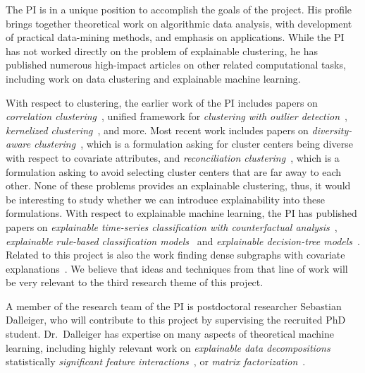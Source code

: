 \documentclass[a4paper,11pt]{article}
\begin{document}

The PI is in a unique position to accomplish the goals of the project. 
His profile brings together theoretical work on algorithmic data analysis, 
with development of practical data-mining methods, and emphasis on applications. 
While the PI has not worked directly on the problem of explainable clustering,
he has published numerous high-impact articles on other related computational tasks, 
including work on data clustering and explainable machine learning. 

With respect to clustering, 
the earlier work of the PI includes papers on
\emph{correlation clustering}~\cite{bonchi2013overlapping,gionis2007clustering},
unified framework for \emph{clustering with outlier detection}~\cite{chawla2013k},
\emph{kernelized clustering}~\cite{amid2015kernel}, and more.
Most recent work includes papers on
\emph{diversity-aware clustering}~\cite{thejaswi2021diversity}, 
which is a formulation asking for cluster centers being diverse with respect to covariate attributes, and
\emph{reconciliation clustering}~\cite{spoerhase2023constant}, 
which is a formulation asking to avoid selecting cluster centers that are far away to each other.
None of these problems provides an explainable clustering, 
thus, it would be interesting to study whether we can introduce explainability
into these formulations.
%
With respect to explainable machine learning, 
the PI has published papers on 
\emph{explainable time-series classification with counterfactual analysis}~\cite{karlsson2020locally},
\emph{explainable rule-based classification models}~\cite{ciaperoni2023concise,zhang2020diverse}
and 
\emph{explainable decision-tree models}~\cite{zhang2023regularized}. 
Related to this project is also the work
finding dense subgraphs with covariate explanations~\cite{galbrun2014overlapping,galbrun2016top}.
We believe that ideas and techniques from that line of work
will be very relevant to the third research theme of this project.

A member of the research team of the PI is postdoctoral researcher Sebastian Dalleiger, 
who will contribute to this project by supervising the recruited PhD student.
Dr.\ Dalleiger has expertise on many aspects of theoretical machine learning, 
including highly relevant work on \emph{explainable data decompositions}~\cite{dalleiger2020explainable}
statistically \emph{significant feature interactions}~\cite{XXX}, 
or \emph{matrix factorization}~\cite{dalleiger2022efficiently}.
\end{document}
